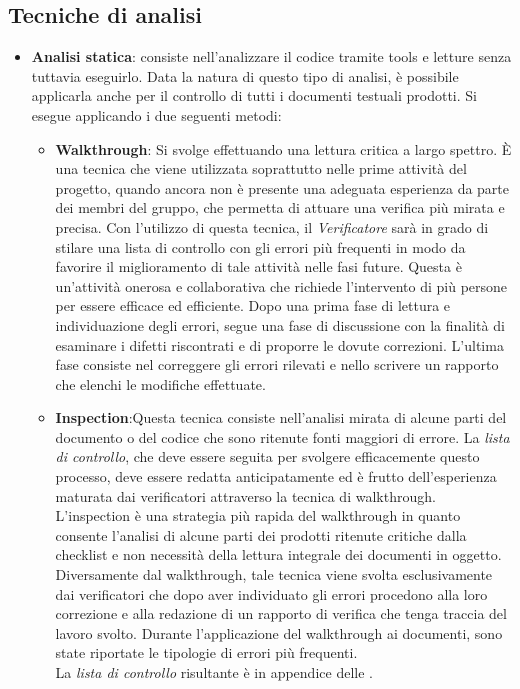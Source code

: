 \subsection{Tecniche di analisi }{
      \label{sec:tecnicheAnalisi}
	\begin{itemize}
		\item \textbf{Analisi statica}: consiste nell’analizzare il codice tramite tools e letture senza tuttavia eseguirlo. Data la natura di questo tipo di analisi, è possibile applicarla anche per il controllo di tutti i documenti testuali prodotti.
		Si esegue applicando i due seguenti metodi:
		\begin{itemize}
		   	\item \textbf{Walkthrough}: Si svolge effettuando una lettura critica a largo spettro. È una tecnica che viene utilizzata soprattutto nelle prime attività del progetto, quando ancora non è presente 	una adeguata esperienza da parte dei membri del gruppo, che permetta di attuare una	verifica più mirata e precisa.
		   	Con l’utilizzo di questa tecnica, il \emph{Verificatore} sarà in grado di stilare una lista di	controllo con gli errori più frequenti in modo da favorire il miglioramento di tale attività nelle fasi future.	Questa è un’attività onerosa e collaborativa che richiede l’intervento di più persone per essere efficace ed efficiente. Dopo una prima fase di lettura e individuazione degli errori, segue una fase di discussione con la finalità di esaminare i difetti riscontrati e di proporre le dovute correzioni. L’ultima fase consiste nel correggere gli errori rilevati e	nello scrivere un rapporto che elenchi le modifiche effettuate.
		   
			\item \textbf{Inspection}:Questa tecnica consiste nell’analisi mirata di alcune parti del documento o del codice che sono ritenute fonti maggiori di errore. La \emph{lista di controllo}, che deve essere seguita per svolgere efficacemente questo processo, deve essere redatta anticipatamente ed è frutto dell’esperienza maturata dai verificatori attraverso la tecnica di walkthrough. L’inspection è una strategia più rapida del walkthrough in quanto consente l’analisi di alcune parti dei prodotti ritenute critiche dalla checklist e non necessità della lettura	integrale dei documenti in oggetto.	Diversamente dal walkthrough, tale tecnica viene svolta esclusivamente dai verificatori	che dopo aver individuato gli errori procedono alla loro correzione e alla redazione di un rapporto di verifica che tenga traccia del lavoro svolto.
			Durante l’applicazione del walkthrough ai documenti, sono state riportate le tipologie di errori più frequenti.\\
			 La \emph{lista di controllo} risultante è in appendice delle \NormeDiProgetto.
			

\end{itemize}
\end{itemize}}
